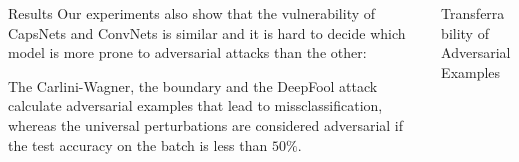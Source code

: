 \documentclass[final]{beamer}
\newlength{\onecolwid}
\newlength{\twocolwid}
\begin{document}
\begin{frame}[t]
\begin{columns}[t]
\begin{column}{\twocolwid}
\begin{columns}[t,totalwidth=\twocolwid]
\begin{column}{\onecolwid}
\begin{block}{Results}
	Our experiments also show that
	the vulnerability of CapsNets and ConvNets is similar and it is hard
	to decide which model is more prone to adversarial attacks than the
	other:
	\vspace{1cm}
	\begin{table}
		\centering{}
		\caption{Average perturbation norms for each attack and architecture.}
		\label{tab:norms}
	\end{table}
	
	The Carlini-Wagner, the boundary and the DeepFool attack calculate adversarial examples that lead to missclassification, whereas the universal perturbations are considered adversarial if the test accuracy on the batch is less than $50\%$.
	
\end{block}

\end{column} %

\begin{column}{\onecolwid}\vspace{-.6in} %
\begin{block}{Transferrability of Adversarial Examples}
	

\end{block}
\end{column}
\end{columns}
\end{column}
\end{columns}
\end{frame}
\end{document}
